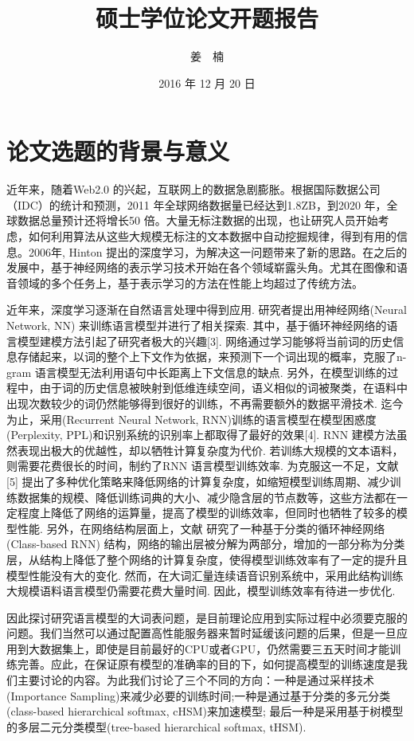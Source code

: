 \documentclass[twoside]{buaathesis}
\title{硕士学位论文开题报告}
\author{姜~~楠}
\date{2016 年 12 月 20 日}
\begin{document}
\maketitle

\tableofcontents
\newpage


\section{论文选题的背景与意义}
近年来，随着Web2.0 的兴起，互联网上的数据急剧膨胀。根据国际数据公司（IDC）的统计和预测，2011 年全球网络数据量已经达到1.8ZB，到2020 年，全球数据总量预计还将增长50 倍。大量无标注数据的出现，也让研究人员开始考虑，如何利用算法从这些大规模无标注的文本数据中自动挖掘规律，得到有用的信息。2006年, Hinton 提出的深度学习\cite{hinton2006reducing}，为解决这一问题带来了新的思路。在之后的发展中，基于神经网络的表示学习技术开始在各个领域崭露头角。尤其在图像和语音领域的多个任务上，基于表示学习的方法在性能上均超过了传统方法。

近年来，深度学习逐渐在自然语言处理中得到应用. 研究者提出用神经网络(Neural Network, NN) 来训练语言模型并进行了相关探索\cite{DBLP:conf/nips/BengioDV00}. 其中，基于循环神经网络的语言模型建模方法引起了研究者极大的兴趣[3]. 网络通过学习能够将当前词的历史信息存储起来，以词的整个上下文作为依据，来预测下一个词出现的概率，克服了n-gram 语言模型无法利用语句中长距离上下文信息的缺点. 另外，在模型训练的过程中，由于词的历史信息被映射到低维连续空间，语义相似的词被聚类，在语料中出现次数较少的词仍然能够得到很好的训练，不再需要额外的数据平滑技术. 迄今为止，采用(Recurrent Neural Network, RNN)训练的语言模型在模型困惑度(Perplexity, PPL)和识别系统的识别率上都取得了最好的效果[4]. RNN 建模方法虽然表现出极大的优越性，却以牺牲计算复杂度为代价. 若训练大规模的文本语料，则需要花费很长的时间，制约了RNN 语言模型训练效率. 为克服这一不足，文献[5] 提出了多种优化策略来降低网络的计算复杂度，如缩短模型训练周期、减少训练数据集的规模、降低训练词典的大小、减少隐含层的节点数等，这些方法都在一定程度上降低了网络的运算量，提高了模型的训练效率，但同时也牺牲了较多的模型性能. 另外，在网络结构层面上，文献\cite{DBLP:journals/coling/BrownPdLM92} 研究了一种基于分类的循环神经网络(Class-based RNN) 结构，网络的输出层被分解为两部分，增加的一部分称为分类层，从结构上降低了整个网络的计算复杂度，使得模型训练效率有了一定的提升且模型性能没有大的变化. 然而，在大词汇量连续语音识别系统中，采用此结构训练大规模语料语言模型仍需要花费大量时间. 因此，模型训练效率有待进一步优化.

因此探讨研究语言模型的大词表问题，是目前理论应用到实际过程中必须要克服的问题。我们当然可以通过配置高性能服务器来暂时延缓该问题的后果，但是一旦应用到大数据集上，即使是目前最好的CPU或者GPU，仍然需要三五天时间才能训练完善。应此，在保证原有模型的准确率的目的下，如何提高模型的训练速度是我们主要讨论的内容。为此我们讨论了三个不同的方向：一种是通过采样技术(Importance Sampling)来减少必要的训练时间;一种是通过基于分类的多元分类(class-based hierarchical softmax, cHSM)来加速模型; 最后一种是采用基于树模型的多层二元分类模型(tree-based hierarchical softmax, tHSM).
\end{document}
